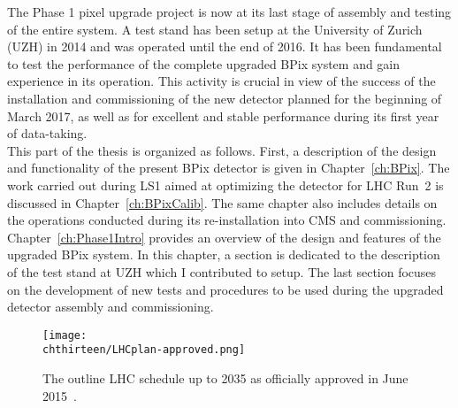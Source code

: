 The Phase 1 pixel upgrade project is now at its last stage of assembly and testing of the entire system.
A test stand has been setup at the University of Zurich (UZH) in 2014 and was operated until the end of 2016. It has been fundamental to test the performance of the complete upgraded BPix system and gain experience in its operation.
This activity is crucial in view of the success of the installation and commissioning of the new detector planned for the beginning of March 2017, as well as for excellent and stable performance during its first year of data-taking.\\

This part of the thesis is organized as follows.
First, a description of the design and functionality of the present BPix detector is given in Chapter~\ref{ch:BPix}.
The work carried out during LS1 aimed at optimizing the detector for LHC Run~2 is discussed in Chapter~\ref{ch:BPixCalib}.
The same chapter also includes details on the operations conducted during its re-installation into CMS and commissioning.
Chapter~\ref{ch:Phase1Intro} provides an overview of the design and features of the upgraded BPix system.
In this chapter, a section is dedicated to the description of the test stand at UZH which I contributed to setup.
The last section focuses on the development of new tests and procedures to be used during the upgraded detector assembly and commissioning.

\begin{figure}[!t]
 \begin{center}
 \texttt{[image: \\chthirteen/LHCplan-approved.png]}
 \end{center}
 \caption{The outline LHC schedule up to 2035 as officially approved in June 2015~\cite{LHCpage}.}
 \label{fig:LHCplan}
\end{figure}